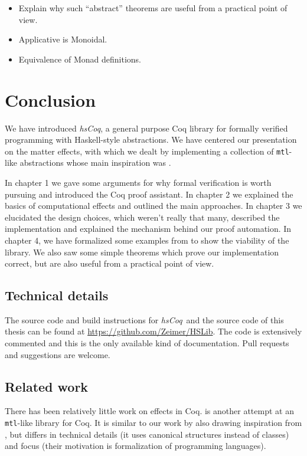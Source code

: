 \documentclass[declaration,inz,english,shortabstract]{iithesis}
\newcommand{\libname}{\textit{hsCoq}}
\newcommand{\homepage}{\url{https://github.com/Zeimer/HSLib}}
\newcommand{\m}[1]{\texttt{#1}}
\begin{document}
\begin{itemize}
    \item Explain why such ``abstract'' theorems are useful from a practical point of view.
    \item Applicative is Monoidal.
    \item Equivalence of Monad definitions.
\end{itemize}

\chapter{Conclusion}

We have introduced \libname, a general purpose Coq library for formally verified programming with Haskell-style abstractions. We have centered our presentation on the matter effects, with which we dealt by implementing a collection of \m{mtl}-like abstractions whose main inspiration was \cite{JustDoIt}.

In chapter 1 we gave some arguments for why formal verification is worth pursuing and introduced the Coq proof assistant. In chapter 2 we explained the basics of computational effects and outlined the main approaches. In chapter 3 we elucidated the design choices, which weren't really that many, described the implementation and explained the mechanism behind our proof automation. In chapter 4, we have formalized some examples from \cite{JustDoIt} to show the viability of the library. We also saw some simple theorems which prove our implementation correct, but are also useful from a practical point of view.

\section{Technical details}

The source code and build instructions for \libname\ and the source code of this thesis can be found at \homepage. The code is extensively commented and this is the only available kind of documentation. Pull requests and suggestions are welcome.

\section{Related work}

There has been relatively little work on effects in Coq. \cite{MERC} is another attempt at an \m{mtl}-like library for Coq. It is similar to our work by also drawing inspiration from \cite{JustDoIt}, but differs in technical details (it uses canonical structures instead of classes) and focus (their motivation is formalization of programming languages).
\end{document}

